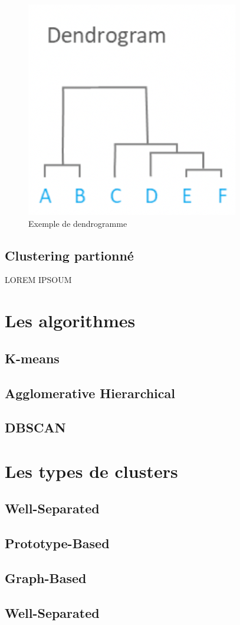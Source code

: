 \documentclass[memoire]{subfiles}
\begin{document}
	\begin{figure}
		\includegraphics[scale=0.8]{img/hierarchical_clustering.png}
		\caption{Exemple de dendrogramme}
	\end{figure}
	
\newpage
\subsection{Clustering partionné}
LOREM IPSOUM

\section{Les algorithmes}
\subsection{K-means}
\subsection{Agglomerative Hierarchical }
\subsection{DBSCAN}

\section{Les types de clusters}
\subsection{Well-Separated}
\subsection{Prototype-Based}
\subsection{Graph-Based}
\subsection{Well-Separated}
\end{document}
